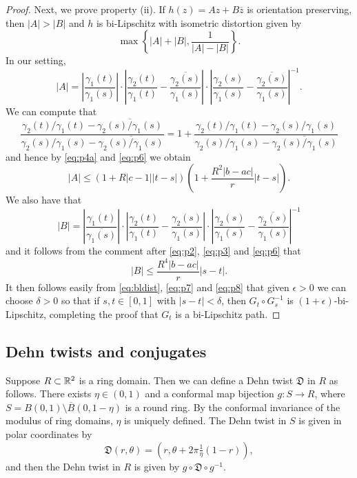 \documentclass{amsart}
\begin{document}
\begin{proof}
Next, we prove property (ii). If $h(z) = Az+B\overline{z}$ is orientation preserving, then $|A| > |B|$ and $h$ is bi-Lipschitz with isometric distortion given by
\begin{equation}
\label{eq:bldist} 
\max \left \{ |A| + |B| , \frac{1}{|A|-|B| } \right \} .
\end{equation}
In our setting, 
\[ |A| = \left | \frac{ \gamma_1(t) }{\gamma_1(s)} \right | \cdot \left | \frac{\gamma_2(t)}{\gamma_1(t)} - \overline{ \frac{\gamma_2(s)}{\gamma_1(s) } } \right | \cdot \left | \frac{\gamma_2(s)}{\gamma_1(s)} - \overline{ \frac{ \gamma_2(s)}{\gamma_1(s)} } \right |^{-1}.\]
We can compute that
\[ \frac{ \gamma_2(t) / \gamma_1(t) - \overline{ \gamma_2(s)/\gamma_1(s)} }{ \gamma_2(s) /\gamma_1(s) - \overline{ \gamma_2(s) / \gamma_1(s)} } = 1 + \frac{ \gamma_2(t)/ \gamma_1(t) - \gamma_2(s)/ \gamma_1(s) }{  \gamma_2(s) /\gamma_1(s) - \overline{ \gamma_2(s) / \gamma_1(s)} }  \]
and hence by \eqref{eq:p4a} and \eqref{eq:p6} we obtain
\begin{equation}
\label{eq:p7}
|A| \leq \left  (1+ R|c-1| |t-s| \right ) \left ( 1+ \frac{R^2 |b-ac| }{r} |t-s| \right ).
\end{equation}
We also have that
\[ |B| = \left | \frac{ \gamma_1(t) }{\overline{\gamma_1(s)}} \right |  \cdot \left | \frac{\gamma_2(t)}{\gamma_1(t)} -  \frac{\gamma_2(s)}{\gamma_1(s) }  \right | \cdot \left | \frac{\gamma_2(s)}{\gamma_1(s)} - \overline{ \frac{ \gamma_2(s)}{\gamma_1(s)} } \right |^{-1}\]
and it follows from the comment after \eqref{eq:p2}, \eqref{eq:p3} and \eqref{eq:p6} that
\begin{equation}
\label{eq:p8}
|B| \leq \frac{R^4|b-ac|}{r} |s-t|.
\end{equation}
It then follows easily from \eqref{eq:bldist}, \eqref{eq:p7} and \eqref{eq:p8} that given $\epsilon >0$ we can choose $\delta >0$ so that if $s,t\in [0,1]$ with $|s-t| <\delta$, then $G_t\circ G_s^{-1}$ is $(1+\epsilon)$-bi-Lipschitz, completing the proof that $G_t$ is a bi-Lipschitz path.
\end{proof}

\subsection{Dehn twists and conjugates}
\label{sect:f}

Suppose $R\subset \mathbb{R}^2$ is a ring domain. Then we can define a Dehn twist $\mathfrak{D}$ in $R$ as follows. There exists $\eta \in (0,1)$ and a conformal map bijection $g:S\to R$, where $S = B(0,1)\setminus \overline{B}(0,1-\eta)$ is a round ring. By the conformal invariance of the modulus of ring domains, $\eta$ is uniquely defined. The Dehn twist in $S$ is given in polar coordinates by
\[ \mathfrak{D}(r,\theta) = \left ( r , \theta + 2\pi\tfrac1{\eta}(1-r) \right ),\]
and then the Dehn twist in $R$ is given by $g\circ \mathfrak{D} \circ g^{-1}$.
\end{document}
